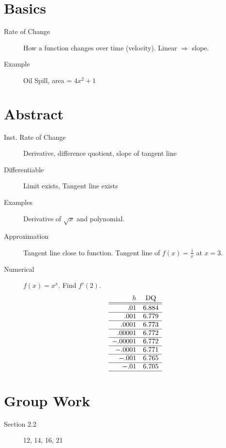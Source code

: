 \documentclass[11pt]{article}
\begin{document}
\drawtitle

\section*{Basics}
\begin{description}
\item[Rate of Change] How a function changes over time (velocity).
  Linear $\Rightarrow$ slope.
\item[Example] Oil Spill, area = $4x^2+1$
\end{description}

\section*{Abstract}
\begin{description}
\item[Inst. Rate of Change] Derivative, difference quotient, slope of
  tangent line
\item[Differentiable] Limit exists, Tangent line exists
\item[Examples] Derivative of $\sqrt{x}$ and polynomial.
\item[Approximation] Tangent line close to function. Tangent line of
  $f(x)=\displaystyle\frac{1}{x}$ at $x=3$.
\item[Numerical] $f(x)=x^x$. Find $f'(2)$.
  \[
  \begin{array}{rc}
    h & \text{DQ}\\ \hline\hline
        .01 & 6.884 \\ \hline
       .001 & 6.779 \\ \hline
      .0001 & 6.773 \\ \hline
     .00001 & 6.772 \\ \hline
    -.00001 & 6.772 \\ \hline
     -.0001 & 6.771 \\ \hline
      -.001 & 6.765 \\ \hline
       -.01 & 6.705 \\ \hline
  \end{array}
  \]
\end{description}

\section*{Group Work}
\begin{description}
\item[Section 2.2] 12, 14, 16, 21
\end{description}
\end{document}
